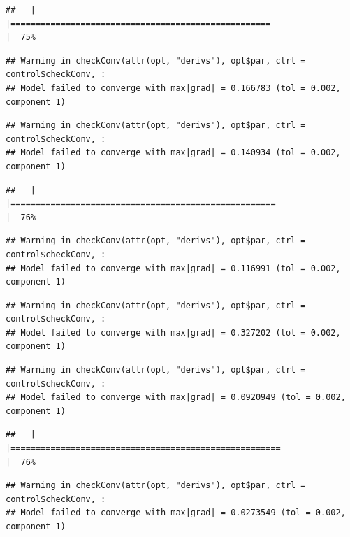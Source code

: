 \documentclass[
  12pt,
]{book}
\begin{document}
\begin{verbatim}
##   |                                                                              |====================================================                  |  75%
\end{verbatim}

\begin{verbatim}
## Warning in checkConv(attr(opt, "derivs"), opt$par, ctrl = control$checkConv, :
## Model failed to converge with max|grad| = 0.166783 (tol = 0.002, component 1)
\end{verbatim}

\begin{verbatim}
## Warning in checkConv(attr(opt, "derivs"), opt$par, ctrl = control$checkConv, :
## Model failed to converge with max|grad| = 0.140934 (tol = 0.002, component 1)
\end{verbatim}

\begin{verbatim}
##   |                                                                              |=====================================================                 |  76%
\end{verbatim}

\begin{verbatim}
## Warning in checkConv(attr(opt, "derivs"), opt$par, ctrl = control$checkConv, :
## Model failed to converge with max|grad| = 0.116991 (tol = 0.002, component 1)
\end{verbatim}

\begin{verbatim}
## Warning in checkConv(attr(opt, "derivs"), opt$par, ctrl = control$checkConv, :
## Model failed to converge with max|grad| = 0.327202 (tol = 0.002, component 1)
\end{verbatim}

\begin{verbatim}
## Warning in checkConv(attr(opt, "derivs"), opt$par, ctrl = control$checkConv, :
## Model failed to converge with max|grad| = 0.0920949 (tol = 0.002, component 1)
\end{verbatim}

\begin{verbatim}
##   |                                                                              |======================================================                |  76%
\end{verbatim}

\begin{verbatim}
## Warning in checkConv(attr(opt, "derivs"), opt$par, ctrl = control$checkConv, :
## Model failed to converge with max|grad| = 0.0273549 (tol = 0.002, component 1)
\end{verbatim}
\end{document}
